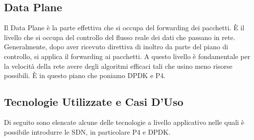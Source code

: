 \subsection*{Data Plane}
Il Data Plane è la parte effettiva che si occupa del forwarding dei pacchetti. È il livello che si occupa del controllo del flusso reale dei dati che passano in rete.
Generalmente, dopo aver ricevuto direttiva di inoltro da parte del piano di controllo, si applica il forwarding ai pacchetti. A questo livello è fondamentale per la velocità della rete avere degli algoritmi efficaci tali che usino meno risorse possibili. È in questo piano che poniamo DPDK e P4.

\subsection*{Tecnologie Utilizzate e Casi D'Uso}
Di seguito sono elencate alcune delle tecnologie a livello applicativo nelle quali è possibile introdurre le SDN, in particolare P4 e DPDK. 

